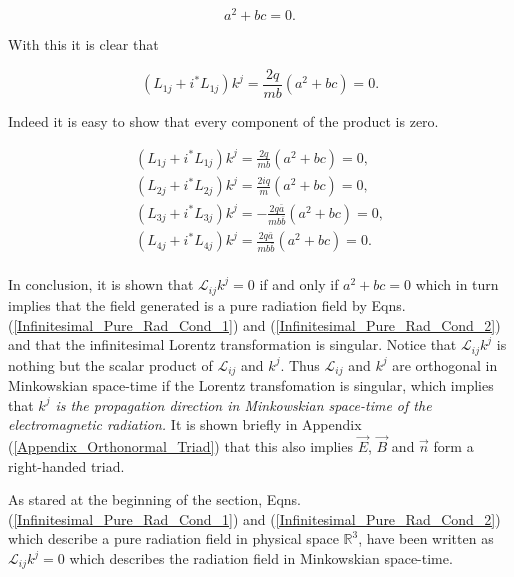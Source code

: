 \begin{equation*}   
a^2 + bc = 0.
\end{equation*}

\noindent With this it is clear that 

$$(L_{1j} + i ^*L_{1j}) k^j  = \frac{2q}{mb} (a^2 + bc) = 0.$$

\noindent Indeed it is easy to show that every component of the product is zero.

\begin{gather*}
(L_{1j} + i ^*L_{1j}) k^j  = \frac{2q}{mb} (a^2 + bc) = 0, \\
(L_{2j} + i ^*L_{2j}) k^j  = \frac{2iq}{m} (a^2 + bc) = 0, \\
(L_{3j} + i ^*L_{3j}) k^j  = -\frac{2q\bar{a}}{mb\bar{b}} (a^2 + bc) = 0, \\
(L_{4j} + i ^*L_{4j}) k^j  = \frac{2q\bar{a}}{mb\bar{b}} (a^2 + bc) = 0. \\
\end{gather*}

In conclusion, it is shown that $\mathcal{L}_{ij} k^j = 0$ if and only if $a^2 + bc = 0$ which in turn implies that the field generated is a pure radiation field by Eqns.(\ref{Infinitesimal_Pure_Rad_Cond_1}) and (\ref{Infinitesimal_Pure_Rad_Cond_2}) and that the infinitesimal Lorentz transformation is singular. Notice that $\mathcal{L}_{ij} k^j$ is nothing but the scalar product of $\mathcal{L}_{ij}$ and $k^j$. Thus $\mathcal{L}_{ij}$ and $k^j$ are orthogonal in Minkowskian space-time if the Lorentz transfomation is singular, which implies that \textit{$k^j$ is the propagation direction in Minkowskian space-time of the electromagnetic radiation.} It is shown briefly in Appendix (\ref{Appendix_Orthonormal_Triad}) that this also implies $\vec{E}$, $\vec{B}$ and $\vec{n}$ form a right-handed triad.  

As stared at the beginning of the section, Eqns.(\ref{Infinitesimal_Pure_Rad_Cond_1}) and (\ref{Infinitesimal_Pure_Rad_Cond_2}) which describe a pure radiation field in physical space $\mathbb{R}^3$, have been written as $\mathcal{L}_{ij} k^j = 0$ which describes the radiation field in Minkowskian space-time.
   




  










